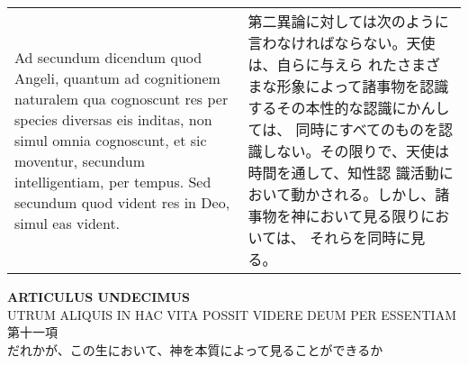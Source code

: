\documentclass[10pt]{jsarticle} %
\begin{document}
\begin{longtable}{p{21em}p{21em}}
\\



{\sc Ad secundum dicendum} quod Angeli, quantum ad cognitionem
naturalem qua cognoscunt res per species diversas eis inditas, non
simul omnia cognoscunt, et sic moventur, secundum intelligentiam, per
tempus. Sed secundum quod vident res in Deo, simul eas vident.


&

第二異論に対しては次のように言わなければならない。天使は、自らに与えら
れたさまざまな形象によって諸事物を認識するその本性的な認識にかんしては、
同時にすべてのものを認識しない。その限りで、天使は時間を通して、知性認
識活動において動かされる。しかし、諸事物を神において見る限りにおいては、
それらを同時に見る。


\end{longtable}


\newpage
{}


\begin{center}
 {\Large {\bf ARTICULUS UNDECIMUS}}\\
 {\large UTRUM ALIQUIS IN HAC VITA POSSIT VIDERE DEUM PER ESSENTIAM\\
第十一項\\
だれかが、この生において、神を本質によって見ることができるか}
\end{center}
\end{document}
